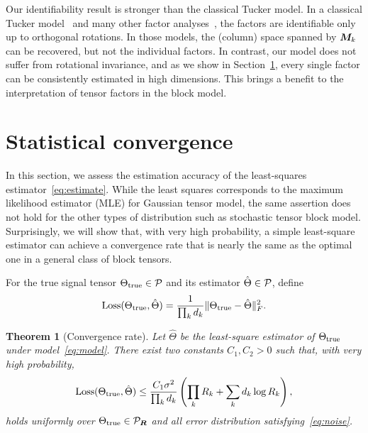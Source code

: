 \documentclass{article}
\newtheorem{theorem}{Theorem}
\begin{document}
Our identifiability result is stronger than the classical Tucker model. In a classical Tucker model~\cite{zhang2018tensor,kolda2009tensor} and many other factor analyses~\cite{darton1980rotation,abdi2003factor}, the factors are identifiable only up to orthogonal rotations. In those models, the (column) space spanned by $\bm M_k$ can be recovered, but not the individual factors. In contrast, our model does not suffer from rotational invariance, and as we show in Section~\ref{sec:theory}, every single factor can be consistently estimated in high dimensions. This brings a benefit to the interpretation of tensor factors in the block model.  



\section{Statistical convergence}\label{sec:theory}
In this section, we assess the estimation accuracy of the least-squares estimator~\eqref{eq:estimate}. While the least squares corresponds to the maximum likelihood estimator (MLE) for Gaussian tensor model, the same assertion does not hold for the other types of distribution such as stochastic tensor block model. Surprisingly, we will show that, with very high probability, a simple least-square estimator can achieve a convergence rate that is nearly the same as the optimal one in a general class of block tensors. 

For the true signal tensor $\Theta_{\text{true}}\in\mathcal{P}$ and its estimator $\hat \Theta\in\mathcal{P}$, define
\[
\text{Loss}(\Theta_{\text{true}},\hat \Theta)={1\over \prod_k d_k}\lVert\Theta_{\text{true}}-\hat \Theta\rVert_F^2. 
\]

\begin{theorem}[Convergence rate] \label{thm:main}
Let $\hat \Theta$ be the least-square estimator of $\Theta_{\text{true}}$ under model~\eqref{eq:model}. There exist two constants $C_1, C_2>0$ such that, with very high probability,  
\begin{equation}\label{eq:bound}
\text{Loss}(\Theta_{\text{true}},\hat \Theta)\leq {C_1 \sigma^2\over  \prod_k d_k} \left(\prod_k R_k+\sum_k d_k \log R_k\right),
\end{equation}
holds uniformly over $\Theta_{\text{true}}\in\mathcal{P}_{\bm{R}}$ and all error distribution satisfying~\eqref{eq:noise}. 
\end{theorem}
\end{document}
